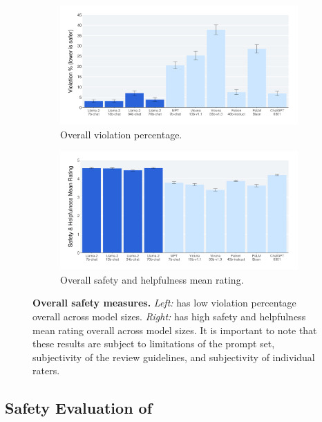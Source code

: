 \begin{figure}[!htbp]
    \centering
    \begin{subfigure}{.51\textwidth}
        \centering
        \includegraphics[width=\textwidth]{img/safety_human_eval/overall_violation.png}
        \caption{Overall violation percentage.}
        \label{fig:safety_overall_violation}
    \end{subfigure}%
    \begin{subfigure}{.51\textwidth}
        \centering
        \includegraphics[width=\textwidth]{img/safety_human_eval/rating.png}
        \caption{Overall safety and helpfulness mean rating.}
        \label{fig:safety_rating}
    \end{subfigure}
    \caption{\textbf{Overall safety measures.} 
    \textit{Left:} \modelname has low violation percentage overall across model sizes.
    \textit{Right:} \modelname has high safety and helpfulness mean rating overall across model sizes. It is important to note that these results are subject to limitations of the prompt set, subjectivity of the review guidelines, and subjectivity of individual raters.}
    \label{fig:safety_overall}
\end{figure}

\subsection{Safety Evaluation of \modelname}
\label{sec:safety_results}

